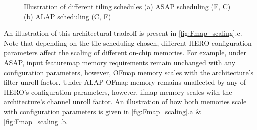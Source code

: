 \begin{figure}
    \centering
    \hspace{0.1cm} 
    \caption{Illustration of different tiling schedules (a) ASAP scheduling (F, C)  (b) ALAP scheduling (C, F)}
    \label{fig:tile_scheduling}
\end{figure}

An illustration of this architectural tradeoff is present
in \autoref{fig:Fmap_scaling}.c. Note that depending on the tile scheduling
chosen, different HERO configuration parameters affect the scaling of different
on-chip memories. For example, under ASAP, input featuremap memory requirements
remain unchanged with any configuration parameters, however, OFmap memory scales
with the architecture's filter unroll factor. Under ALAP OFmap memory remains
unaffected by any of HERO's configuration parameters, however, ifmap memory scales
with the architecture's channel unroll factor. An illustration of how both
memories scale with configuration parameters is given in
\autoref{fig:Fmap_scaling}.a \& \autoref{fig:Fmap_scaling}.b. 

